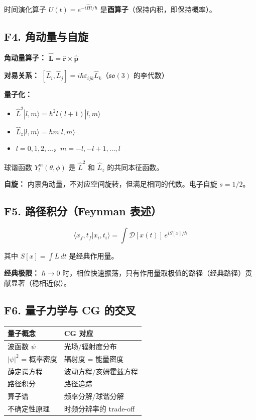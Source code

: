 时间演化算子 $U(t) = e^{-i\hat{H}t/\hbar}$ 是\textbf{酉算子}（保持内积，即保持概率）。

\subsection{F4. 角动量与自旋}

\textbf{角动量算子：} $\hat{\mathbf{L}} = \hat{\mathbf{r}} \times \hat{\mathbf{p}}$

\textbf{对易关系：} $[\hat{L}_i, \hat{L}_j] = i\hbar\varepsilon_{ijk}\hat{L}_k$（$\mathfrak{so}(3)$ 的李代数）

\textbf{量子化：}
\begin{itemize}
  \item $\hat{L}^2|l,m\rangle = \hbar^2 l(l+1)|l,m\rangle$
  \item $\hat{L}_z|l,m\rangle = \hbar m|l,m\rangle$
  \item $l = 0, 1, 2, \ldots$，$m = -l, -l+1, \ldots, l$
\end{itemize}

球谐函数 $Y_l^m(\theta, \phi)$ 是 $\hat{L}^2$ 和 $\hat{L}_z$ 的共同本征函数。

\textbf{自旋：} 内禀角动量，不对应空间旋转，但满足相同的代数。电子自旋 $s = 1/2$。

\subsection{F5. 路径积分（Feynman 表述）}

\[
\langle x_f, t_f | x_i, t_i \rangle = \int \mathcal{D}[x(t)]\, e^{iS[x]/\hbar}
\]

其中 $S[x] = \displaystyle\int L\,dt$ 是经典作用量。

\textbf{经典极限：} $\hbar \to 0$ 时，相位快速振荡，只有作用量取极值的路径（经典路径）贡献显著（稳相近似）。

\subsection{F6. 量子力学与 CG 的交叉}

\begin{center}
\begin{tabular}{ll}
\toprule
\textbf{量子概念} & \textbf{CG 对应} \\
\midrule
波函数 $\psi$ & 光场/辐射度分布 \\
$|\psi|^2$ = 概率密度 & 辐射度 = 能量密度 \\
薛定谔方程 & 波动方程/亥姆霍兹方程 \\
路径积分 & 路径追踪 \\
算子谱 & 频率分解/球谐分解 \\
不确定性原理 & 时频分辨率的 trade-off \\
\bottomrule
\end{tabular}
\end{center}